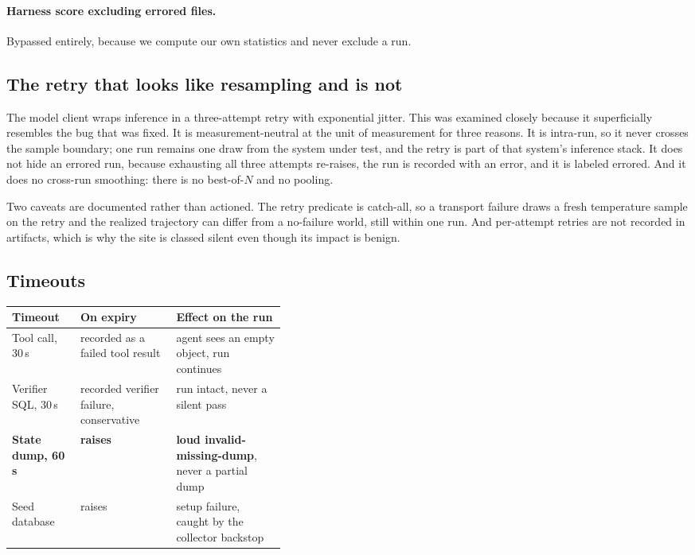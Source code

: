 \paragraph{Harness score excluding errored files.} Bypassed entirely, because we
compute our own statistics and never exclude a run.

\subsection{The retry that looks like resampling and is not}

The model client wraps inference in a three-attempt retry with exponential
jitter. This was examined closely because it superficially resembles the bug that
was fixed. It is measurement-neutral at the unit of measurement for three
reasons. It is intra-run, so it never crosses the sample boundary; one run
remains one draw from the system under test, and the retry is part of that
system's inference stack. It does not hide an errored run, because exhausting all
three attempts re-raises, the run is recorded with an error, and it is labeled
errored. And it does no cross-run smoothing: there is no best-of-$N$ and no
pooling.

Two caveats are documented rather than actioned. The retry predicate is
catch-all, so a transport failure draws a fresh temperature sample on the retry
and the realized trajectory can differ from a no-failure world, still within one
run. And per-attempt retries are not recorded in artifacts, which is why the site
is classed silent even though its impact is benign.

\subsection{Timeouts}

\begin{table}[h]
\centering
\small
\begin{tabular}{@{}llp{0.40\linewidth}@{}}
\toprule
Timeout & On expiry & Effect on the run \\
\midrule
Tool call, 30\,s & recorded as a failed tool result & agent sees an empty object,
run continues \\
Verifier SQL, 30\,s & recorded verifier failure, conservative & run intact, never
a silent pass \\
\textbf{State dump, 60\,s} & \textbf{raises} & \textbf{loud invalid-missing-dump},
never a partial dump \\
Seed database & raises & setup failure, caught by the collector backstop \\
\bottomrule
\end{tabular}
\end{table}

